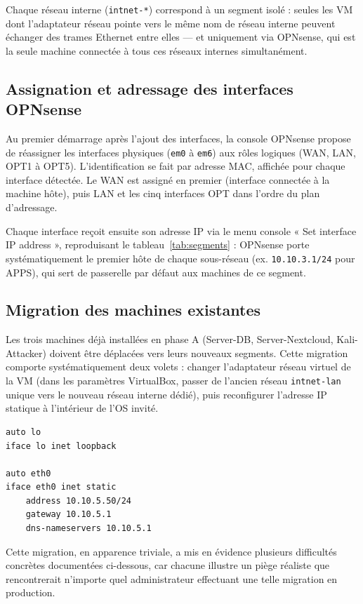 Chaque réseau interne (\texttt{intnet-*}) correspond à un segment isolé :
seules les VM dont l'adaptateur réseau pointe vers le même nom de réseau
interne peuvent échanger des trames Ethernet entre elles — et uniquement
via OPNsense, qui est la seule machine connectée à tous ces réseaux
internes simultanément.

\subsection{Assignation et adressage des interfaces OPNsense}

Au premier démarrage après l'ajout des interfaces, la console OPNsense
propose de réassigner les interfaces physiques (\texttt{em0} à
\texttt{em6}) aux rôles logiques (WAN, LAN, OPT1 à OPT5). L'identification
se fait par adresse MAC, affichée pour chaque interface détectée. Le WAN
est assigné en premier (interface connectée à la machine hôte), puis LAN
et les cinq interfaces OPT dans l'ordre du plan d'adressage.

Chaque interface reçoit ensuite son adresse IP via le menu console
« Set interface IP address », reproduisant le tableau~\ref{tab:segments} :
OPNsense porte systématiquement le premier hôte de chaque sous-réseau
(ex. \texttt{10.10.3.1/24} pour APPS), qui sert de passerelle par défaut
aux machines de ce segment.

\subsection{Migration des machines existantes}

Les trois machines déjà installées en phase A (Server-DB, Server-Nextcloud,
Kali-Attacker) doivent être déplacées vers leurs nouveaux segments. Cette
migration comporte systématiquement deux volets : changer l'adaptateur
réseau virtuel de la VM (dans les paramètres VirtualBox, passer de
l'ancien réseau \texttt{intnet-lan} unique vers le nouveau réseau interne
dédié), puis reconfigurer l'adresse IP statique à l'intérieur de l'OS invité.

\begin{lstlisting}[caption={Configuration réseau statique type (\texttt{/etc/network/interfaces})}]
auto lo
iface lo inet loopback

auto eth0
iface eth0 inet static
    address 10.10.5.50/24
    gateway 10.10.5.1
    dns-nameservers 10.10.5.1
\end{lstlisting}

Cette migration, en apparence triviale, a mis en évidence plusieurs
difficultés concrètes documentées ci-dessous, car chacune illustre un
piège réaliste que rencontrerait n'importe quel administrateur effectuant
une telle migration en production.

